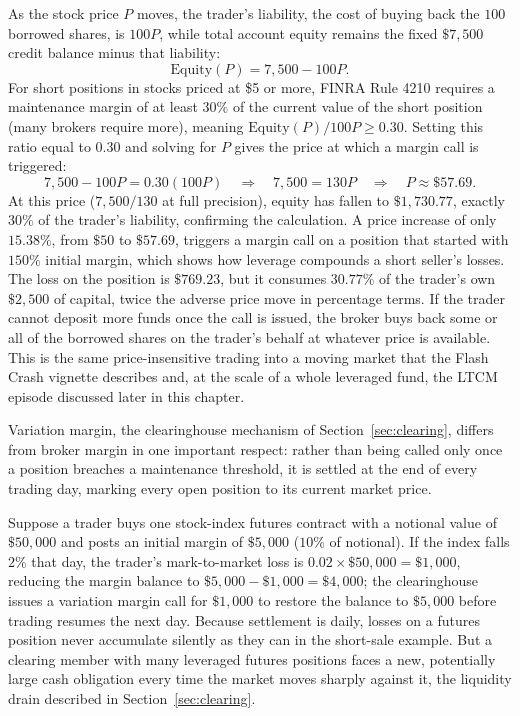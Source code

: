 \documentclass[../ai_in_finance]{subfiles}
\begin{document}
As the stock price $P$ moves, the trader's liability, the cost of buying back the $100$ borrowed shares, is $100P$, while total account equity remains the fixed $\$7{,}500$ credit balance minus that liability:
\begin{equation*}
\text{Equity}(P) = 7{,}500 - 100P.
\end{equation*}
For short positions in stocks priced at \$5 or more, FINRA Rule 4210 requires a maintenance margin of at least $30\%$ of the current value of the short position (many brokers require more), meaning $\text{Equity}(P)/100P \geq 0.30$. Setting this ratio equal to $0.30$ and solving for $P$ gives the price at which a margin call is triggered:
\begin{equation*}
7{,}500 - 100P = 0.30(100P) \quad\Longrightarrow\quad 7{,}500 = 130P \quad\Longrightarrow\quad P \approx \$57.69.
\end{equation*}
At this price ($7{,}500/130$ at full precision), equity has fallen to $\$1{,}730.77$, exactly $30\%$ of the trader's liability, confirming the calculation. A price increase of only $15.38\%$, from $\$50$ to $\$57.69$, triggers a margin call on a position that started with $150\%$ initial margin, which shows how leverage compounds a short seller's losses. The loss on the position is $\$769.23$, but it consumes $30.77\%$ of the trader's own $\$2{,}500$ of capital, twice the adverse price move in percentage terms. If the trader cannot deposit more funds once the call is issued, the broker buys back some or all of the borrowed shares on the trader's behalf at whatever price is available. This is the same price-insensitive trading into a moving market that the Flash Crash vignette describes and, at the scale of a whole leveraged fund, the LTCM episode discussed later in this chapter.

Variation margin, the clearinghouse mechanism of Section~\ref{sec:clearing}, differs from broker margin in one important respect: rather than being called only once a position breaches a maintenance threshold, it is settled at the end of every trading day, marking every open position to its current market price.

Suppose a trader buys one stock-index futures contract with a notional value of $\$50{,}000$ and posts an initial margin of $\$5{,}000$ ($10\%$ of notional). If the index falls $2\%$ that day, the trader's mark-to-market loss is $0.02 \times \$50{,}000 = \$1{,}000$, reducing the margin balance to $\$5{,}000 - \$1{,}000 = \$4{,}000$; the clearinghouse issues a variation margin call for $\$1{,}000$ to restore the balance to $\$5{,}000$ before trading resumes the next day. Because settlement is daily, losses on a futures position never accumulate silently as they can in the short-sale example. But a clearing member with many leveraged futures positions faces a new, potentially large cash obligation every time the market moves sharply against it, the liquidity drain described in Section~\ref{sec:clearing}.
\end{document}
